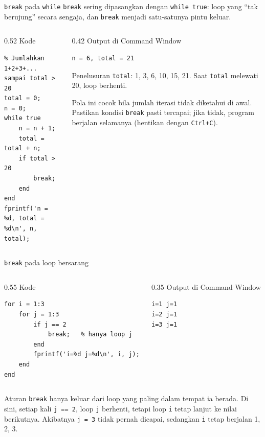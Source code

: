 \documentclass[aspectratio=169,10pt]{beamer}
\newcommand{\kode}[1]{\texttt{#1}}
\newcommand{\labelkode}{{\scriptsize\color{black!60}Kode}}
\newcommand{\labelout}{{\scriptsize\color{alertc}Output di Command Window}}
\begin{document}
\begin{frame}[fragile]{\kode{break} pada \kode{while}}
  \kode{break} sering dipasangkan dengan \kode{while true}: loop yang ``tak berujung'' secara sengaja,
  dan \kode{break} menjadi satu-satunya pintu keluar.
  \vspace{4pt}
  \begin{columns}[T]
    \begin{column}{0.52\textwidth}
      \labelkode
\begin{lstlisting}
% Jumlahkan 1+2+3+... sampai total > 20
total = 0;
n = 0;
while true
    n = n + 1;
    total = total + n;
    if total > 20
        break;
    end
end
fprintf('n = %d, total = %d\n', n, total);
\end{lstlisting}
    \end{column}
    \begin{column}{0.42\textwidth}
      \labelout
\begin{lstlisting}[style=out]
n = 6, total = 21
\end{lstlisting}
      \vspace{4pt}
      \footnotesize
      Penelusuran \kode{total}: 1, 3, 6, 10, 15, \alert{21}. Saat \kode{total} melewati 20, loop berhenti.
      \vspace{4pt}

      Pola ini cocok bila \alert{jumlah iterasi tidak diketahui} di awal. Pastikan kondisi \kode{break}
      pasti tercapai; jika tidak, program berjalan selamanya (hentikan dengan \kode{Ctrl+C}).
    \end{column}
  \end{columns}
\end{frame}

\begin{frame}[fragile]{\kode{break} pada loop bersarang}
  \begin{columns}[T]
    \begin{column}{0.55\textwidth}
      \labelkode
\begin{lstlisting}
for i = 1:3
    for j = 1:3
        if j == 2
            break;   % hanya loop j
        end
        fprintf('i=%d j=%d\n', i, j);
    end
end
\end{lstlisting}
    \end{column}
    \begin{column}{0.35\textwidth}
      \labelout
\begin{lstlisting}[style=out]
i=1 j=1
i=2 j=1
i=3 j=1
\end{lstlisting}
    \end{column}
  \end{columns}
  \vspace{6pt}
  \begin{alertblock}{Aturan}
    \kode{break} hanya keluar dari loop yang \alert{paling dalam} tempat ia berada. Di sini, setiap kali
    \kode{j == 2}, loop \kode{j} berhenti, tetapi loop \kode{i} tetap lanjut ke nilai berikutnya.
    Akibatnya \kode{j = 3} tidak pernah dicapai, sedangkan \kode{i} tetap berjalan 1, 2, 3.
  \end{alertblock}
\end{frame}
\end{document}
